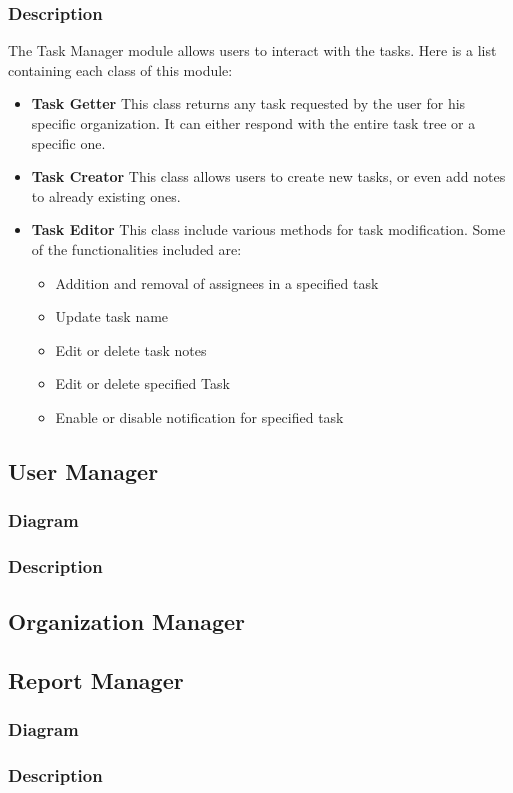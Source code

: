 \documentclass{article}
\begin{document}
\subsubsection{Description}
The Task Manager module allows users to interact with the tasks. Here is a list containing each class of this module:
\begin{itemize}
    \item \textbf{Task Getter}
    This class returns any task requested by the user for his specific organization. It can either respond with the entire task tree or a specific one.
    \item \textbf{Task Creator}
    This class allows users to create new tasks, or even add notes to already existing ones.
    \item \textbf{Task Editor}
    This class include various methods for task modification. Some of the functionalities included are:
    \begin{itemize}
        \item Addition and removal of assignees in a specified task
        \item Update task name
        \item Edit or delete task notes
        \item Edit or delete specified Task
        \item Enable or disable notification for specified task
    \end{itemize}
\end{itemize}
\subsection{User Manager} %

\subsubsection{Diagram}

\subsubsection{Description}

\subsection{Organization Manager}

\subsection{Report Manager} %

\subsubsection{Diagram}

\subsubsection{Description}
\end{document}
